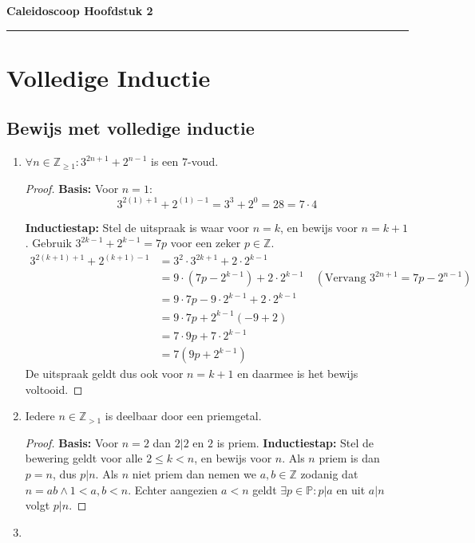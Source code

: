 \documentclass{article}
\begin{document}
\begin{center}
    \Large \textbf{Caleidoscoop Hoofdstuk 2}
\end{center}

\rule{\textwidth}{2pt}

\bigskip

\section{Volledige Inductie}

\subsection{Bewijs met volledige inductie}
\begin{enumerate}[label=\alph*)]
    \item $\forall n \in \mathbb{Z}_{\geq 1} : 3^{2n + 1} + 2^{n-1}$ is een $7$-voud.
        \begin{proof}
            \textbf{Basis:} Voor $n=1$:
            \[
                3^{2(1)+1} + 2^{(1)-1} = 3^3+2^0 = 28 = 7\cdot4
            \]
            
            \textbf{Inductiestap:}
            Stel de uitspraak is waar voor $n=k$, en bewijs voor $n=k+1$. Gebruik $3^{2k-1}+2^{k-1}=7p$ voor een zeker $p \in \mathbb{Z}$.    
            \begin{align*}
                3^{2(k+1)+1} + 2^{(k+1)-1} &= 3^2 \cdot 3^{2k+1} + 2 \cdot 2^{k-1} \\
                &= 9 \cdot (7p-2^{k-1}) + 2 \cdot 2^{k-1} \quad (\text{Vervang }3^{2n+1} = 7p-2^{n-1} )\\
                &= 9 \cdot 7p-9 \cdot 2^{k-1} + 2 \cdot 2^{k-1} \\
                &= 9 \cdot 7p+2^{k-1}(-9+2) \\
                &= 7 \cdot 9p+7 \cdot 2^{k-1} \\
                &= 7(9p+2^{k-1})
            \end{align*}
            De uitspraak geldt dus ook voor $n=k+1$ en daarmee is het bewijs voltooid.
        \end{proof}
    \item Iedere $n \in \mathbb{Z}_{>1}$ is deelbaar door een priemgetal.
        \begin{proof}
            \textbf{Basis:} Voor $n=2$ dan $2 | 2$ en $2$ is priem.
            \textbf{Inductiestap:} Stel de bewering geldt voor alle $2 \leq k < n$, en bewijs voor $n$.
            Als $n$ priem is dan $p = n$, dus $p | n$. Als $n$ niet priem dan nemen we $a, b \in \mathbb{Z}$ zodanig dat $n=ab \wedge 1 < a, b < n$.
            Echter aangezien $a < n$ geldt $\exists p \in \mathbb{P} : p | a$ en uit $  a | n$ volgt $p | n$.
        \end{proof}
    \item 

    
\end{enumerate}
\end{document}

